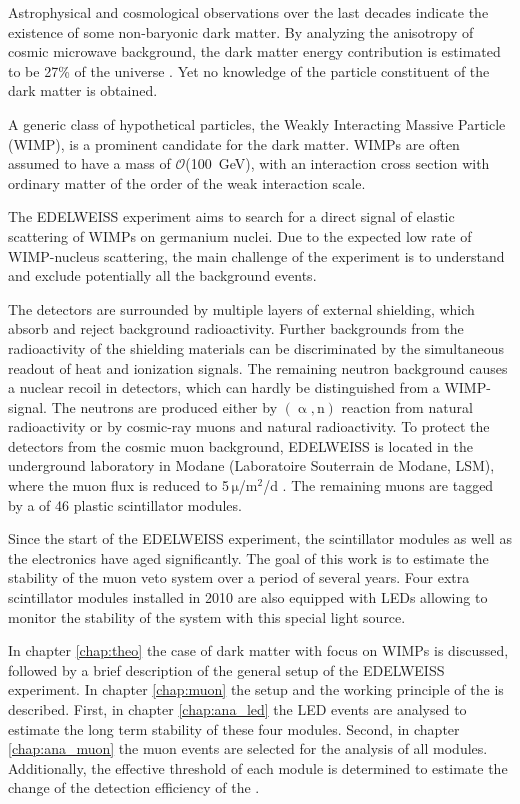 Astrophysical and cosmological observations over the last decades indicate the existence of some non-baryonic dark matter. By analyzing the anisotropy of cosmic microwave background, the dark matter energy contribution is estimated to be 27\% of the universe \cite{Pla16}. Yet no knowledge of the particle constituent of the dark matter is obtained.

A generic class of hypothetical particles, the Weakly Interacting Massive Particle (WIMP), is a prominent candidate for the dark matter. WIMPs are often assumed to have a mass of $\mathcal{O}$(\SI{100}{GeV}), with an interaction cross section with ordinary matter of the order of the weak interaction scale.

The EDELWEISS experiment aims to search for a direct signal of elastic scattering of WIMPs on germanium nuclei. Due to the expected low rate of WIMP-nucleus scattering, the main challenge of the experiment is to understand and exclude potentially all the background events.

The detectors are surrounded by multiple layers of external shielding, which absorb and reject background radioactivity. Further backgrounds from the radioactivity of the shielding materials can be discriminated by the simultaneous readout of heat and ionization signals. The remaining neutron background causes a nuclear recoil in detectors, which can hardly be distinguished from a WIMP-signal. The neutrons are produced either by $(\upalpha,\mathrm{n})$ reaction from natural radioactivity or by cosmic-ray muons and natural radioactivity. To protect the detectors from the cosmic muon background, EDELWEISS is located in the underground laboratory in Modane (Laboratoire Souterrain de Modane, LSM), where the muon flux is reduced to 5\,$\mathrm{\mu}$/$\mathrm{m}^{2}$/d \cite{Sch13a}. The remaining muons are tagged by a \mvs of 46 plastic scintillator modules.

Since the start of the EDELWEISS experiment, the scintillator modules as well as the electronics have aged significantly. The goal of this work is to estimate the stability of the muon veto system over a period of several years. Four extra scintillator modules installed in 2010 are also equipped with LEDs allowing to monitor the stability of the system with this special light source.

In chapter \ref{chap:theo} the case of dark matter with focus on WIMPs is discussed, followed by a brief description of the general setup of the EDELWEISS experiment. In chapter \ref{chap:muon} the setup and the working principle of the \mvs is described. First, in chapter \ref{chap:ana_led} the LED events are analysed to estimate the long term stability of these four modules. Second, in chapter \ref{chap:ana_muon} the muon events are selected for the analysis of all modules. Additionally, the effective threshold of each module is determined to estimate the change of the detection efficiency of the \mvs.
